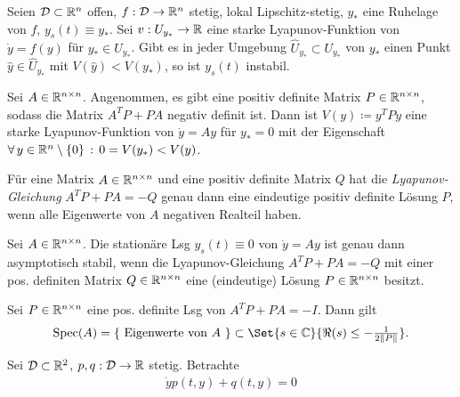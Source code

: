 \documentclass{cheat-sheet}
\newcommand{\D}{\mathcal{D}}
\DeclareMathOperator{\Spec}{Spec} %
\begin{document}
\begin{satz}
  Seien $\D \subset \R^n$ offen, $f : \D \to \R^n$ stetig, lokal Lipschitz-stetig, $y_{*}$ eine Ruhelage von $f$, $y_s(t) \equiv y_{*}$. Sei $v : U_{y_{*}} \to \mathbb{R}$ eine starke Lyapunov-Funktion von $\dot{y} = f(y)$ für $y_{*} \in U_{y_{*}}$. Gibt es in jeder Umgebung $\widehat{U}_{y_{*}} \subset U_{y_{*}}$ von $y_{*}$ einen Punkt $\hat{y} \in \widehat{U}_{y_*}$ mit $V(\hat{y}) < V(y_*)$, so ist $y_s(t)$ instabil.
\end{satz}


\begin{satz}
  Sei $A \in \mathbb{R}^{n \times n}$. Angenommen, es gibt eine positiv definite Matrix $P \in \mathbb{R}^{n \times n}$, sodass die Matrix $A^T P + PA$ negativ definit ist. Dann ist $V(y) \coloneqq y^T P y$ eine starke Lyapunov-Funktion von $\dot{y} = Ay$ für $y_{*} = 0$ mit der Eigenschaft $\forall \, {y \in \mathbb{R}^n \setminus \{ 0 \}} \,:\, 0 = V(y_*) < V(y)$.
\end{satz}

\begin{satz}
  Für eine Matrix $A \in \mathbb{R}^{n \times n}$ und eine positiv definite Matrix $Q$ hat die \emph{Lyapunov-Gleichung} $A^T P + PA = -Q$ genau dann eine eindeutige positiv definite Lösung $P$, wenn alle Eigenwerte von $A$ negativen Realteil haben.
\end{satz}

\begin{kor}
  Sei $A \in \mathbb{R}^{n \times n}$. Die stationäre Lsg $y_s(t) \equiv 0$ von $\dot{y} = Ay$ ist genau dann asymptotisch stabil, wenn die Lyapunov-Gleichung $A^T P + PA = - Q$ mit einer pos. definiten Matrix $Q \in \mathbb{R}^{n \times n}$ eine (eindeutige) Lösung $P \in \mathbb{R}^{n \times n}$ besitzt.
\end{kor}

\begin{satz}
  Sei $P \in \mathbb{R}^{n \times n}$ eine pos. definite Lsg von $A^T P + PA = -I$. Dann gilt
  \[ \Spec(A) = \{ \text{ Eigenwerte von $A$ } \} \subset \Set{s \in \C}{\Re(s) \leq - \tfrac{1}{2 \norm{P}}}. \]
\end{satz}


\begin{prob}
  Sei $\D \subset \R^2$, $p, q : \D \to \R$ stetig. Betrachte
  \begin{align*}
    \dot{y} p(t, y) + q(t, y) = 0 \tag{5.1}
  \end{align*}
\end{prob}
\end{document}
